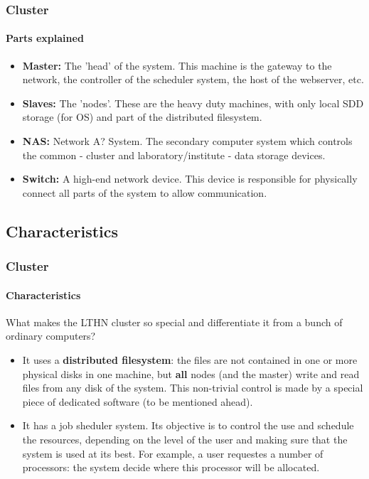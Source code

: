 \documentclass[svgnames,smaller,table]{beamer}
\begin{document}
\begin{frame}
  \frametitle{Cluster}
  \framesubtitle{Parts explained}
  \begin{itemize}
  \item \textbf{Master:} The 'head' of the system. This machine is the gateway to the network, the controller of the scheduler system, the host of the webserver, etc.
  \item \textbf{Slaves:} The 'nodes'. These are the heavy duty machines, with only local SDD storage (for OS) and part of the distributed filesystem.
  \item \textbf{NAS:} Network A? System. The secondary computer system which controls the common - cluster and laboratory/institute - data storage devices.
  \item \textbf{Switch:} A high-end network device. This device is responsible for physically connect all parts of the system to allow communication.
  \end{itemize}
  
\end{frame}


\subsection{Characteristics}
\begin{frame}
  \frametitle{Cluster}
  \framesubtitle{Characteristics}
  What makes the LTHN cluster so special and differentiate it from a bunch of ordinary computers?\\
  \vspace{10px}
  \begin{itemize}
  \item It uses a \textbf{distributed filesystem}: the files are not contained in one or more physical disks in one machine, but \textbf{all} nodes (and the master) write and read files from any disk of the system. This non-trivial control is made by a special piece of dedicated software (to be mentioned ahead). 
  \item It has a job sheduler system. Its objective is to control the use and schedule the resources, depending on the level of the user and making sure that the system is used at its best. For example, a user requestes a number of processors: the system decide where this processor will be allocated.
  \end{itemize}
\end{frame}
\end{document}
